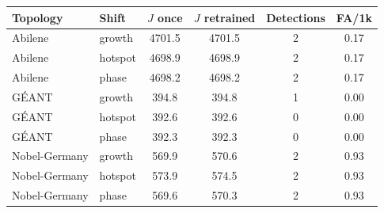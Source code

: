 \begin{tabular}{@{}llcccc@{}}
\toprule
Topology & Shift & $J$ once & $J$ retrained & Detections & FA/1k \\
\midrule
Abilene & growth & 4701.5 & 4701.5 & 2 & 0.17 \\
Abilene & hotspot & 4698.9 & 4698.9 & 2 & 0.17 \\
Abilene & phase & 4698.2 & 4698.2 & 2 & 0.17 \\
\midrule
G\'{E}ANT & growth & 394.8 & 394.8 & 1 & 0.00 \\
G\'{E}ANT & hotspot & 392.6 & 392.6 & 0 & 0.00 \\
G\'{E}ANT & phase & 392.3 & 392.3 & 0 & 0.00 \\
\midrule
Nobel-Germany & growth & 569.9 & 570.6 & 2 & 0.93 \\
Nobel-Germany & hotspot & 573.9 & 574.5 & 2 & 0.93 \\
Nobel-Germany & phase & 569.6 & 570.3 & 2 & 0.93 \\

\bottomrule
\end{tabular}
